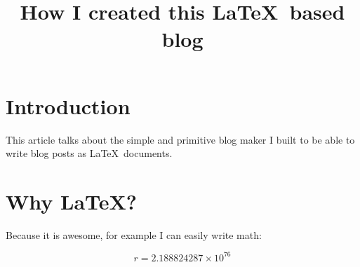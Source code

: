 \documentclass{article}
\title{How I created this \LaTeX \ based blog}
\begin{document}
\maketitle

\section{Introduction}
This article talks about the simple and primitive blog maker I built to be able to write blog posts as \LaTeX \ documents.

\section{Why \LaTeX ?}

Because it is awesome, for example I can easily write math:

\[ r = 2.188824287 \times 10^{76} \]
\end{document}
